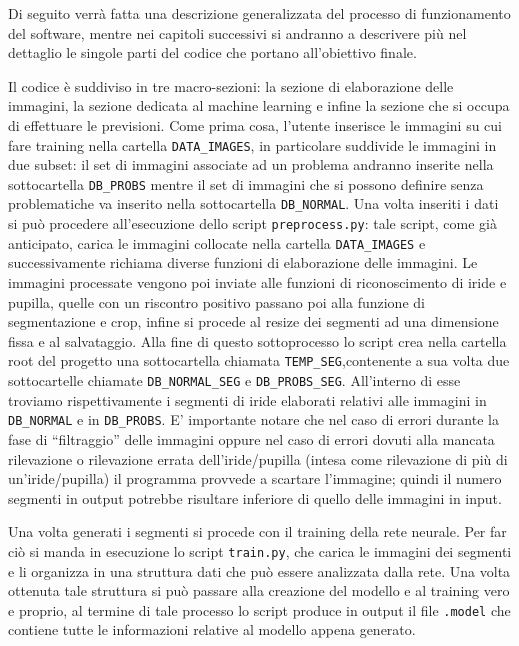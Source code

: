 Di seguito verrà fatta una descrizione generalizzata del processo di funzionamento del software, mentre nei capitoli successivi si andranno a descrivere più nel dettaglio le singole parti del codice che portano all’obiettivo finale. 

Il codice è suddiviso in tre macro-sezioni: la sezione di elaborazione delle immagini, la sezione dedicata al machine learning e infine la sezione che si occupa di effettuare le previsioni. Come prima cosa, l’utente inserisce le immagini su cui fare training nella cartella \texttt{DATA\_IMAGES}, in particolare suddivide le immagini in due subset: il set di immagini associate ad un problema andranno inserite nella sottocartella \texttt{DB\_PROBS} mentre il set di immagini che si possono definire senza problematiche va inserito nella sottocartella \texttt{DB\_NORMAL}. Una volta inseriti i dati si può procedere all’esecuzione dello script \texttt{preprocess.py}: tale script, come già anticipato, carica le immagini collocate nella cartella \texttt{DATA\_IMAGES} e successivamente richiama diverse funzioni di elaborazione delle immagini. Le immagini processate vengono poi inviate alle funzioni di riconoscimento di iride e pupilla, quelle con un riscontro positivo passano poi alla funzione di segmentazione e crop, infine si procede al resize dei segmenti ad una dimensione fissa e al salvataggio. Alla fine di questo sottoprocesso lo script crea nella cartella root del progetto una sottocartella chiamata \texttt{TEMP\_SEG},contenente a sua volta due sottocartelle chiamate \texttt{DB\_NORMAL\_SEG} e \texttt{DB\_PROBS\_SEG}. All’interno di esse troviamo rispettivamente i segmenti di iride elaborati relativi  alle immagini in \texttt{DB\_NORMAL} e in \texttt{DB\_PROBS}. E’ importante notare che nel caso di errori durante la fase di “filtraggio” delle immagini oppure nel caso di errori dovuti alla mancata rilevazione o rilevazione errata dell’iride/pupilla (intesa come rilevazione di più di un’iride/pupilla)  il programma provvede a scartare l’immagine; quindi il numero segmenti in output potrebbe risultare inferiore di quello delle immagini in input. 

Una volta generati i segmenti si procede con il training della rete neurale. Per far ciò si manda in esecuzione lo script \texttt{train.py}, che carica le immagini dei segmenti e li organizza in una struttura dati che può essere analizzata dalla rete. Una volta ottenuta tale struttura si può passare alla creazione del modello e al training vero e proprio, al termine di tale processo lo script produce in output il file \texttt{.model} che contiene tutte le informazioni relative al modello appena generato. 

